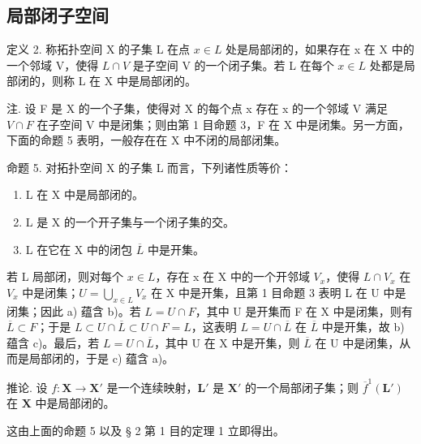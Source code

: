 \subsection{局部闭子空间}

定义 2. 称拓扑空间 X 的子集 L 在点 \(x \in L\) 处是局部闭的，如果存在 x 在 X 中的一个邻域 V，使得 \(L \cap V\) 是子空间 V 的一个闭子集。若 L 在每个 \(x \in L\) 处都是局部闭的，则称 L 在 X 中是局部闭的。

注. 设 F 是 X 的一个子集，使得对 X 的每个点 x 存在 x 的一个邻域 V 满足 \(V \cap F\) 在子空间 V 中是闭集；则由第 1 目命题 3，F 在 X 中是闭集。另一方面，下面的命题 5 表明，一般存在在 X 中不闭的局部闭集。

命题 5. 对拓扑空间 X 的子集 L 而言，下列诸性质等价：

\begin{enumerate}
\def\labelenumi{\alph{enumi})}
\item
  L 在 X 中是局部闭的。
\item
  L 是 X 的一个开子集与一个闭子集的交。
\item
  L 在它在 X 中的闭包 \(\overline{L}\) 中是开集。
\end{enumerate}

若 L 局部闭，则对每个 \(x \in L\)，存在 x 在 X 中的一个开邻域 \(V_{x}\)，使得 \(L \cap V_{x}\) 在 \(V_{x}\) 中是闭集；\(U = \bigcup_{x \in L} V_{x}\) 在 X 中是开集，且第 1 目命题 3 表明 L 在 U 中是闭集；因此 a) 蕴含 b)。若 \(L = U \cap F\)，其中 U 是开集而 F 在 X 中是闭集，则有 \(\overline{L} \subset F\)；于是 \(L \subset U \cap \overline{L} \subset U \cap F = L\)，这表明 \(L = U \cap \overline{L}\) 在 \(\overline{L}\) 中是开集，故 b) 蕴含 c)。最后，若 \(L = U \cap \overline{L}\)，其中 U 在 X 中是开集，则 \(\overline{L}\) 在 U 中是闭集，从而是局部闭的，于是 c) 蕴含 a)。

推论. 设 \(f: \mathbf{X} \to \mathbf{X}'\) 是一个连续映射，\(\mathbf{L}'\) 是 \(\mathbf{X}'\) 的一个局部闭子集；则 \(\overline{f}^{1}(\mathbf{L}')\) 在 \(\mathbf{X}\) 中是局部闭的。

这由上面的命题 5 以及 § 2 第 1 目的定理 1 立即得出。

